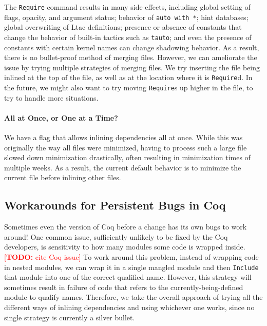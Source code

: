 \documentclass[a4paper,USenglish,cleveref,autoref,thm-restate]{lipics-v2021}
\makeatletter
\newcommand{\todo}[1]{%
\@latex@warning{TODO: \detokenize{#1} on page \thepage}%
\textcolor{red}{[\textbf{TODO:} #1]}}%
\makeatother
\begin{document}
The \texttt{Require} command results in many side effects, including global setting of flags, opacity, and argument status; behavior of \texttt{auto with *}; hint databases; global overwriting of Ltac definitions; presence or absence of constants that change the behavior of built-in tactics such as \texttt{tauto}; and even the presence of constants with certain kernel names can change shadowing behavior.
As a result, there is no bullet-proof method of merging files.
However, we can ameliorate the issue by trying multiple strategies of merging files.
We try inserting the file being inlined at the top of the file, as well as at the location where it is \texttt{Require}d.
In the future, we might also want to try moving \texttt{Require}s up higher in the file, to try to handle more situations.

\paragraph{All at Once, or One at a Time?}

We have a flag that allows inlining dependencies all at once.
While this was originally the way all files were minimized, having to process such a large file slowed down minimization drastically, often resulting in minimization times of multiple weeks.
As a result, the current default behavior is to minimize the current file before inlining other files.

\subsection{Workarounds for Persistent Bugs in Coq}

Sometimes even the version of Coq before a change has its own bugs to work around!
One common issue, sufficiently unlikely to be fixed by the Coq developers, is sensitivity to how many modules some code is wrapped inside.
\todo{cite Coq issue}
To work around this problem, instead of wrapping code in nested modules, we can wrap it in a single mangled module and then \texttt{Include} that module into one of the correct qualified name.
However, this strategy will sometimes result in failure of code that refers to the currently-being-defined module to qualify names.
Therefore, we take the overall approach of trying all the different ways of inlining dependencies and using whichever one works, since no single strategy is currently a silver bullet.


\end{document}
